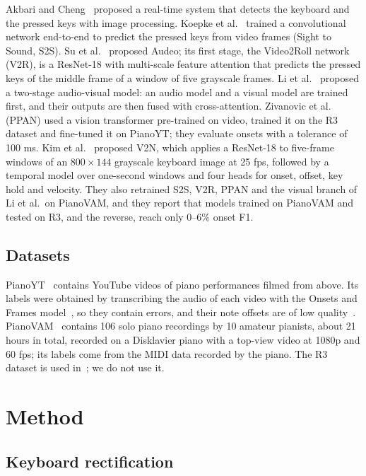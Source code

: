 \documentclass[pdflatex,sn-mathphys-num]{sn-jnl}
\begin{document}
Akbari and Cheng~\cite{akbari2015} proposed a real-time system that detects the keyboard and the pressed keys with image processing. Koepke et al.~\cite{koepke2020} trained a convolutional network end-to-end to predict the pressed keys from video frames (Sight to Sound, S2S). Su et al.~\cite{su2020} proposed Audeo; its first stage, the Video2Roll network (V2R), is a ResNet-18 with multi-scale feature attention that predicts the pressed keys of the middle frame of a window of five grayscale frames. Li et al.~\cite{li2024} proposed a two-stage audio-visual model: an audio model and a visual model are trained first, and their outputs are then fused with cross-attention. Zivanovic et al.~\cite{zivanovic2025} (PPAN) used a vision transformer pre-trained on video, trained it on the R3 dataset and fine-tuned it on PianoYT; they evaluate onsets with a tolerance of 100 ms. Kim et al.~\cite{kim2026v2n} proposed V2N, which applies a ResNet-18 to five-frame windows of an $800\times144$ grayscale keyboard image at 25 fps, followed by a temporal model over one-second windows and four heads for onset, offset, key hold and velocity. They also retrained S2S, V2R, PPAN and the visual branch of Li et al.\ on PianoVAM, and they report that models trained on PianoVAM and tested on R3, and the reverse, reach only 0--6\% onset F1.

\subsection{Datasets}

PianoYT~\cite{su2020} contains YouTube videos of piano performances filmed from above. Its labels were obtained by transcribing the audio of each video with the Onsets and Frames model~\cite{hawthorne2018,su2020}, so they contain errors, and their note offsets are of low quality~\cite{zivanovic2025}. PianoVAM~\cite{kim2025pianovam} contains 106 solo piano recordings by 10 amateur pianists, about 21 hours in total, recorded on a Disklavier piano with a top-view video at 1080p and 60 fps; its labels come from the MIDI data recorded by the piano. The R3 dataset is used in~\cite{zivanovic2025,kim2026v2n}; we do not use it.

\section{Method}\label{sec:method}

\subsection{Keyboard rectification}
\end{document}
